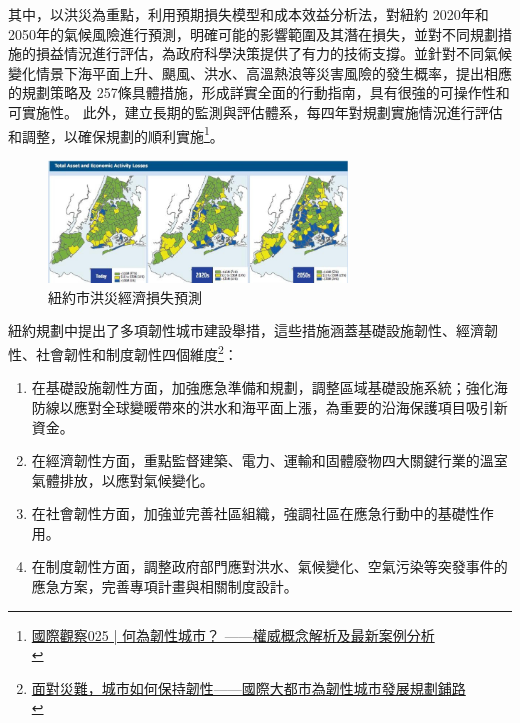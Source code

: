 \documentclass[a4paper,12pt]{article}
\begin{document}
\begin{enumerate}
其中，以洪災為重點，利用預期損失模型和成本效益分析法，對紐約 2020年和2050年的氣候風險進行預測，明確可能的影響範圍及其潛在損失，並對不同規劃措施的損益情況進行評估，為政府科學決策提供了有力的技術支撐。並針對不同氣候變化情景下海平面上升、颶風、洪水、高溫熱浪等災害風險的發生概率，提出相應的規劃策略及 257條具體措施，形成詳實全面的行動指南，具有很強的可操作性和可實施性。 此外，建立長期的監測與評估體系，每四年對規劃實施情況進行評估和調整，以確保規劃的順利實施\footnote{\href{https://www.google.com/url?sa=t\&rct=j\&q=\&esrc=s\&source=web\&cd=\&cad=rja\&uact=8\&ved=2ahUKEwiMp83GrsPvAhUGVpQKHQ5OAb8QFjABegQIAhAD\&url=http\%3A\%2F\%2Fread01.com\%2Fzh-tw\%2FNyB3R3Q.html\&usg=AOvVaw0q41fGXsI96FVJ784m4j7M}{國際觀察025  | 何為韌性城市？  ——權威概念解析及最新案例分析}\\}。\\

\begin{figure}[htbp]
\centering
\includegraphics[width=300]{images/ny1.png}
\caption{\label{fig:NY-1}紐約市洪災經濟損失預測}
\end{figure}

紐約規劃中提出了多項韌性城市建設舉措，這些措施涵蓋基礎設施韌性、經濟韌性、社會韌性和制度韌性四個維度\footnote{\href{https://news.gmw.cn/2020-04/09/content\_33725150.htm}{面對災難，城市如何保持韌性——國際大都市為韌性城市發展規劃鋪路}\\}：\\
\begin{enumerate}
\item 在基礎設施韌性方面，加強應急準備和規劃，調整區域基礎設施系統；強化海防線以應對全球變暖帶來的洪水和海平面上漲，為重要的沿海保護項目吸引新資金。\\
\item 在經濟韌性方面，重點監督建築、電力、運輸和固體廢物四大關鍵行業的溫室氣體排放，以應對氣候變化。\\
\item 在社會韌性方面，加強並完善社區組織，強調社區在應急行動中的基礎性作用。\\
\item 在制度韌性方面，調整政府部門應對洪水、氣候變化、空氣污染等突發事件的應急方案，完善專項計畫與相關制度設計。\\
\end{enumerate}
\end{enumerate}
\end{document}
